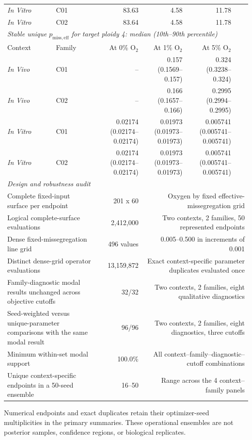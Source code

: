 \begin{longtable}{@{}llrrrrp{}@{}}
\textit{In Vitro} & C01 & 83.63 & 4.58 & 11.78 & & \\
\textit{In Vitro} & C02 & 83.64 & 4.58 & 11.78 & & \\
\midrule
\multicolumn{7}{l}{\textit{Stable unique $p_{\mathrm{miss,eff}}$ for target ploidy 4: median (10th--90th percentile)}} \\
Context & Family & At 0\% O$_2$ & At 1\% O$_2$ & At 5\% O$_2$ & & \\
\textit{In Vivo} & C01 & -- & 0.157 (0.1569--0.157) & 0.324 (0.3238--0.324) & & \\
\textit{In Vivo} & C02 & -- & 0.166 (0.1657--0.166) & 0.2995 (0.2994--0.2995) & & \\
\textit{In Vitro} & C01 & 0.02174 (0.02174--0.02174) & 0.01973 (0.01973--0.01973) & 0.005741 (0.005741--0.005741) & & \\
\textit{In Vitro} & C02 & 0.02174 (0.02174--0.02174) & 0.01973 (0.01973--0.01973) & 0.005741 (0.005741--0.005741) & & \\
\midrule
\multicolumn{7}{l}{\textit{Design and robustness audit}} \\
\multicolumn{2}{l}{Complete fixed-input surface per endpoint} & 201 x 60 & \multicolumn{4}{p{0.47\textwidth}}{Oxygen by fixed effective-missegregation grid} \\
\multicolumn{2}{l}{Logical complete-surface evaluations} & 2,412,000 & \multicolumn{4}{p{0.47\textwidth}}{Two contexts, 2 families, 50 represented endpoints} \\
\multicolumn{2}{l}{Dense fixed-missegregation line grid} & 496 values & \multicolumn{4}{p{0.47\textwidth}}{0.005--0.500 in increments of 0.001} \\
\multicolumn{2}{l}{Distinct dense-grid operator evaluations} & 13,159,872 & \multicolumn{4}{p{0.47\textwidth}}{Exact context-specific parameter duplicates evaluated once} \\
\multicolumn{2}{l}{Family-diagnostic modal results unchanged across objective cutoffs} & 32/32 & \multicolumn{4}{p{0.47\textwidth}}{Two contexts, 2 families, eight qualitative diagnostics} \\
\multicolumn{2}{l}{Seed-weighted versus unique-parameter comparisons with the same modal result} & 96/96 & \multicolumn{4}{p{0.47\textwidth}}{Two contexts, 2 families, eight diagnostics, three cutoffs} \\
\multicolumn{2}{l}{Minimum within-set modal support} & 100.0\% & \multicolumn{4}{p{0.47\textwidth}}{All context--family--diagnostic--cutoff combinations} \\
\multicolumn{2}{l}{Unique context-specific endpoints in a 50-seed ensemble} & 16--50 & \multicolumn{4}{p{0.47\textwidth}}{Range across the 4 context--family panels} \\
\bottomrule
\end{longtable}
\noindent\footnotesize Numerical endpoints and exact duplicates retain their optimizer-seed multiplicities in the primary summaries. These operational ensembles are not posterior samples, confidence regions, or biological replicates.
\endgroup
